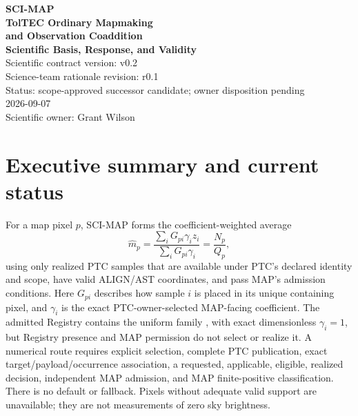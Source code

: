 \documentclass[10pt]{article}
\begin{document}
\hypersetup{pageanchor=false}
\begin{titlepage}
\centering\vspace*{0.48in}
{\Large\color{MapBlue}\textbf{SCI-MAP}}\\[0.18in]
{\huge\color{MapNavy}\textbf{TolTEC Ordinary Mapmaking}}\\[0.08in]
{\LARGE\color{MapNavy}\textbf{and Observation Coaddition}}\\[0.10in]
{\Large\color{MapBlue}\textbf{Scientific Basis, Response, and Validity}}\\[0.38in]
{\large Scientific contract version: v0.2}\\[0.06in]
{\large Science-team rationale revision: r0.1}\\[0.06in]
{\large Status: scope-approved successor candidate; owner disposition pending}\\[0.08in]
{\large 2026-09-07}\\[0.42in]
\vfill {\large Scientific owner: Grant Wilson}
\end{titlepage}
\hypersetup{pageanchor=true}

\section*{Executive summary and current status}
For a map pixel \(p\), SCI-MAP forms the coefficient-weighted average
\begin{equation}
 \widehat m_p=\frac{\sum_iG_{pi}\gamma_i z_i}
                         {\sum_iG_{pi}\gamma_i}
 =\frac{N_p}{Q_p},
 \label{eq:map}
\end{equation}
using only realized PTC samples that are available under PTC's declared
identity and scope, have valid ALIGN/AST coordinates, and pass MAP's admission
conditions. Here \(G_{pi}\) describes how
sample \(i\) is placed in its unique containing pixel, and \(\gamma_i\) is the
exact PTC-owner-selected MAP-facing coefficient. The admitted Registry contains
the uniform family \SCIMapPTCUniformFamily{}, with exact dimensionless
\(\gamma_i=1\), but Registry presence and MAP permission do not select or
realize it. A numerical route requires explicit selection, complete PTC
publication, exact target/payload/occurrence association, a requested,
applicable, eligible, realized \SCIMapPTCUniformHandoffProfile{} decision,
independent MAP admission, and MAP finite-positive classification. There is no
default or fallback. Pixels without adequate valid support are unavailable;
they are not measurements of zero sky brightness.
\end{document}
